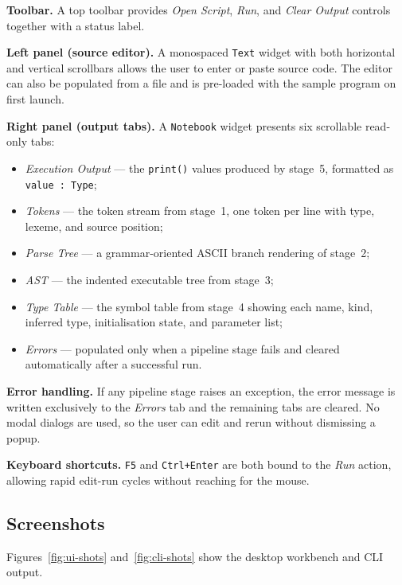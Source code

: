 \textbf{Toolbar.}  A top toolbar provides \textit{Open Script},
\textit{Run}, and \textit{Clear Output} controls together with a status
label.

\textbf{Left panel (source editor).}  A monospaced \texttt{Text} widget
with both horizontal and vertical scrollbars allows the user to enter or
paste source code. The editor can also be populated from a file and is
pre-loaded with the sample program on first launch.

\textbf{Right panel (output tabs).}  A \texttt{Notebook} widget presents
six scrollable read-only tabs:
\begin{itemize}
  \item \textit{Execution Output} --- the \texttt{print()} values produced
        by stage~5, formatted as \texttt{value : Type};
  \item \textit{Tokens} --- the token stream from stage~1, one token per line
        with type, lexeme, and source position;
  \item \textit{Parse Tree} --- a grammar-oriented ASCII branch rendering of
        stage~2;
  \item \textit{AST} --- the indented executable tree from stage~3;
  \item \textit{Type Table} --- the symbol table from stage~4 showing each
        name, kind, inferred type, initialisation state, and parameter list;
  \item \textit{Errors} --- populated only when a pipeline stage fails and
        cleared automatically after a successful run.
\end{itemize}

\textbf{Error handling.}  If any pipeline stage raises an exception, the
error message is written exclusively to the \textit{Errors} tab and the
remaining tabs are cleared. No modal dialogs are used, so the user can edit
and rerun without dismissing a popup.

\textbf{Keyboard shortcuts.}  \texttt{F5} and \texttt{Ctrl+Enter} are both
bound to the \textit{Run} action, allowing rapid edit-run cycles without
reaching for the mouse.

\subsection{Screenshots}
Figures~\ref{fig:ui-shots} and~\ref{fig:cli-shots} show the desktop workbench
and CLI output.

